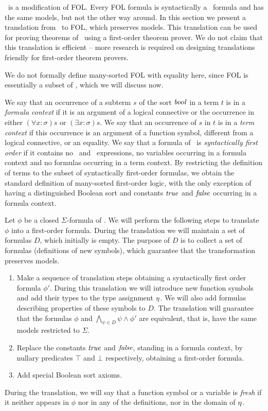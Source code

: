 \folb\ is a modification of FOL. Every FOL formula is syntactically a \folb\ formula and has the same models, but not the other way around. In this section we present a translation from \folb\ to FOL, which preserves models. This translation can be used for proving theorems of \folb\ using a first-order theorem prover. We do not claim that this translation is efficient -- more research is required on designing translations friendly for first-order theorem provers.

We do not formally define many-sorted FOL with equality here, since FOL is essentially a subset of \folb, which we will discuss now.  

We say that an occurrence of a subterm $s$ of the sort $\mathit{bool}$ in a term $t$ is in a \emph{formula context} if it is an argument of a logical connective or the occurrence in either $(\forall x:\sigma)s$ or $(\exists x:\sigma)s$. We say that an occurrence of $s$ in $t$ is in a \emph{term context} if this occurrence is an argument of a function symbol, different from a logical connective, or an equality. We say that a formula of \folb\ is \emph{syntactically first order} if it contains no \ITE\ and \LETIN\ expressions, no variables occurring in a formula context and no formulas occurring in a term context. By restricting the definition of terms to the subset of syntactically first-order formulas, we obtain the standard definition of many-sorted first-order logic, with the only exception of having a distinguished Boolean sort and constants $\mathit{true}$ and $\mathit{false}$ occurring in a formula context.

Let $\phi$ be a closed $\Sigma$-formula of \folb{}. We will perform the following steps to translate $\phi$ into a first-order formula. During the translation we will maintain a set of formulas $D$, which initially is empty. The purpose of $D$ is to collect a set of formulas (definitions of new symbols), which guarantee that the transformation preserves models.

\begin{enumerate}
\item Make a sequence of translation steps obtaining a syntactically first order formula $\phi'$. During this translation we will introduce new function symbols and add their types to the type assignment $\eta$. We will also add formulas describing properties of these symbols to $D$. The translation will guarantee that the formulas $\phi$ and $\bigwedge_{\psi \in D}\psi \wedge \phi'$ are equivalent, that is, have the same models restricted to $\Sigma$.

\item Replace the constants $\mathit{true}$ and $\mathit{false}$, standing in a formula context, by nullary predicates $\top$ and $\bot$ respectively, obtaining a first-order formula.

\item Add special Boolean sort axioms.
\end{enumerate}
During the translation, we will say that a function symbol or a variable is \emph{fresh} if it neither appears in $\phi$ nor in any of the definitions, nor in the domain of $\eta$.

